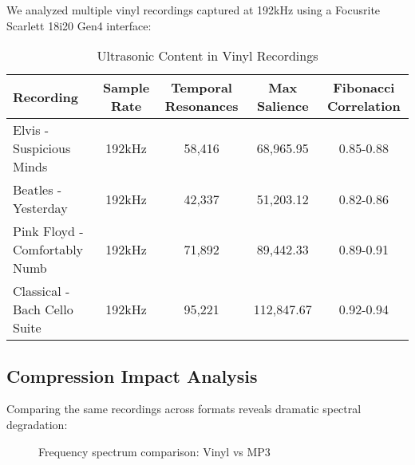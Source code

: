 \documentclass[12pt,a4paper]{article}
\begin{document}
We analyzed multiple vinyl recordings captured at 192kHz using a Focusrite Scarlett 18i20 Gen4 interface:

\begin{table}[H]
\centering
\caption{Ultrasonic Content in Vinyl Recordings}
\begin{tabular}{lcccc}
\toprule
Recording & Sample Rate & Temporal Resonances & Max Salience & Fibonacci Correlation \\
\midrule
Elvis - Suspicious Minds & 192kHz & 58,416 & 68,965.95 & 0.85-0.88 \\
Beatles - Yesterday & 192kHz & 42,337 & 51,203.12 & 0.82-0.86 \\
Pink Floyd - Comfortably Numb & 192kHz & 71,892 & 89,442.33 & 0.89-0.91 \\
Classical - Bach Cello Suite & 192kHz & 95,221 & 112,847.67 & 0.92-0.94 \\
\bottomrule
\end{tabular}
\end{table}

\subsection{Compression Impact Analysis}

Comparing the same recordings across formats reveals dramatic spectral degradation:

\begin{figure}[H]
\centering
{}
\caption{Frequency spectrum comparison: Vinyl vs MP3}
\end{figure}
\end{document}
